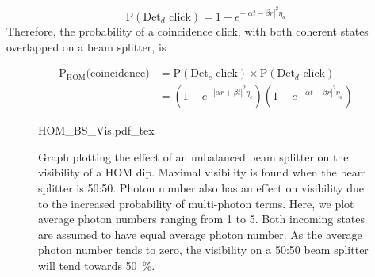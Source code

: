 \begin{equation}
	\text{P}(\text{Det}_d \text{ click}) = 1 - e^{-|\alpha t - \beta r|^2 \eta_d}
\end{equation}
Therefore, the probability of a coincidence click, with both coherent states overlapped on a beam splitter, is

\begin{align}
	\text{P}_\text{HOM}\text{(coincidence)} &= \text{P}(\text{Det}_c \text{ click}) \times \text{P}(\text{Det}_d \text{ click})\\
	&= \left(1 - e^{-|\alpha r + \beta t|^2 \eta_c}\right)\left(1 - e^{-|\alpha t - \beta r|^2 \eta_d}\right)
\end{align}



\begin{figure}[t]
	\centering
	\small
	\def\svgwidth{0.8\textwidth} 
	{HOM_BS_Vis.pdf_tex}
	\caption[Coherent state photon number visibility against beam splitter ratio]{Graph plotting the effect of an unbalanced beam splitter on the visibility of a HOM dip. Maximal visibility is found when the beam splitter is 50:50. Photon number also has an effect on visibility due to the increased probability of multi-photon terms. Here, we plot average photon numbers ranging from 1 to 5. Both incoming states are assumed to have equal average photon number. As the average photon number tends to zero, the visibility on a 50:50 beam splitter will tend towards \SI{50}{\percent}.}
	\label{fig:HOM_BS_Vis}
\end{figure}

